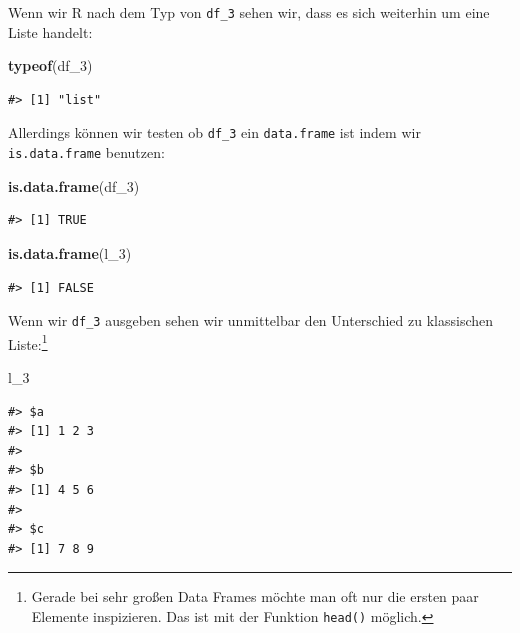 \documentclass[]{book}
\newenvironment{Shaded}{\begin{snugshade}}{\end{snugshade}}
\newcommand{\KeywordTok}[1]{\textcolor[rgb]{0.13,0.29,0.53}{\textbf{#1}}}
\newcommand{\DecValTok}[1]{\textcolor[rgb]{0.00,0.00,0.81}{#1}}
\newcommand{\NormalTok}[1]{#1}
\let\rmarkdownfootnote\footnote%
\def\footnote{\protect\rmarkdownfootnote}
\begin{document}
Wenn wir R nach dem Typ von \texttt{df\_3} sehen wir, dass es sich
weiterhin um eine Liste handelt:

\begin{Shaded}
\begin{Highlighting}[]
\KeywordTok{typeof}\NormalTok{(df_}\DecValTok{3}\NormalTok{)}
\end{Highlighting}
\end{Shaded}

\begin{verbatim}
#> [1] "list"
\end{verbatim}

Allerdings können wir testen ob \texttt{df\_3} ein \texttt{data.frame}
ist indem wir \texttt{is.data.frame} benutzen:

\begin{Shaded}
\begin{Highlighting}[]
\KeywordTok{is.data.frame}\NormalTok{(df_}\DecValTok{3}\NormalTok{)}
\end{Highlighting}
\end{Shaded}

\begin{verbatim}
#> [1] TRUE
\end{verbatim}

\begin{Shaded}
\begin{Highlighting}[]
\KeywordTok{is.data.frame}\NormalTok{(l_}\DecValTok{3}\NormalTok{)}
\end{Highlighting}
\end{Shaded}

\begin{verbatim}
#> [1] FALSE
\end{verbatim}

Wenn wir \texttt{df\_3} ausgeben sehen wir unmittelbar den Unterschied
zu klassischen Liste:\footnote{Gerade bei sehr großen Data Frames möchte
  man oft nur die ersten paar Elemente inspizieren. Das ist mit der
  Funktion \texttt{head()} möglich.}

\begin{Shaded}
\begin{Highlighting}[]
\NormalTok{l_}\DecValTok{3}
\end{Highlighting}
\end{Shaded}

\begin{verbatim}
#> $a
#> [1] 1 2 3
#> 
#> $b
#> [1] 4 5 6
#> 
#> $c
#> [1] 7 8 9
\end{verbatim}
\end{document}

